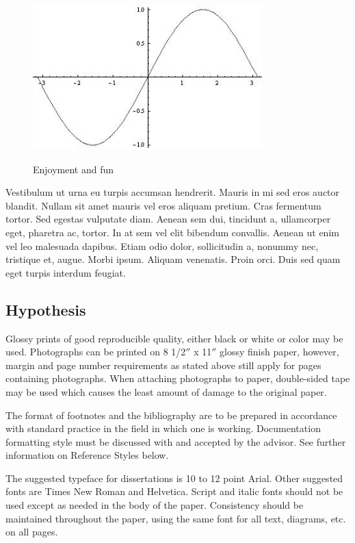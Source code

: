 \begin{figure}
\includegraphics[height=2.5in, width=3.5in]{sin_x.jpg}
\caption{Enjoyment and fun}
\end{figure}

Vestibulum ut urna eu turpis accumsan hendrerit. Mauris in mi sed eros auctor blandit. Nullam sit amet mauris vel eros aliquam pretium. Cras fermentum tortor. Sed egestas vulputate diam. Aenean sem dui, tincidunt a, ullamcorper eget, pharetra ac, tortor. In at sem vel elit bibendum convallis. Aenean ut enim vel leo malesuada dapibus. Etiam odio dolor, sollicitudin a, nonummy nec, tristique et, augue. Morbi ipsum. Aliquam venenatis. Proin orci. Duis sed quam eget turpis interdum feugiat.

\subsection{Hypothesis}  


Glossy prints of good reproducible quality, either black or white or color may be used. Photographs can be printed on 8 1/2$''$ x 11$''$ glossy finish paper, however, margin and page number requirements as stated above still apply for pages containing photographs. When attaching photographs to paper, double-sided tape may be used which causes the least amount of damage to the original paper.

The format of footnotes and the bibliography are to be prepared in accordance with standard practice in the field in which one is working. Documentation formatting style must be discussed with and accepted by the advisor. See further information on Reference Styles below.

The suggested typeface for dissertations is 10 to 12 point Arial. Other suggested fonts are Times New Roman and Helvetica. Script and italic fonts should not be used except as needed in the body of the paper. Consistency should be maintained throughout the paper, using the same font for all text, diagrams, etc. on all pages.

